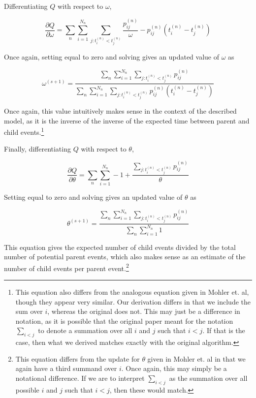 \documentclass[12pt]{amsart}
\begin{document}
Differentiating $Q$ with respect to $\omega$, 

\begin{equation*}
\frac{\partial Q}{\partial \omega}  =  \sum_n \sum_{i=1}^{N_n} \sum_{j : t_i^{(n)} < t_j^{(n)}} \frac{p_{ij}^{(n)}}{\omega} - p_{ij}^{(n)}(t_i^{(n)} - t_j^{(n)}) 
\end{equation*}

Once again, setting equal to zero and solving gives an updated value of $\omega$ as 

\begin{equation*}
\omega^{(s+1)} = \frac{\sum_n \sum_{i=1}^{N_n} \sum_{j : t_i^{(n)} < t_j^{(n)}} p_{ij}^{(n)}}{ \sum_n \sum_{i=1}^{N_n} \sum_{j : t_i^{(n)} < t_j^{(n)}}  p_{ij}^{(n)}(t_i^{(n)} - t_j^{(n)}) }
\end{equation*}

Once again, this value intuitively makes sense in the context of the described model, as it is the inverse of the inverse of the expected time between parent and child events.\footnote{This equation also differs from the analogous equation given in Mohler et. al, though they appear very similar. Our derivation differs in that we include the sum over $i$, whereas the original does not. This may just be a difference in notation, as it is possible that the original paper meant for the notation $\sum_{i<j}$ to denote a summation over all $i$ and $j$ such that $i < j$. If that is the case, then what we derived matches exactly with the original algorithm. }

Finally, differentiating $Q$ with respect to $\theta$,

\begin{equation*}
\frac{\partial Q}{ \partial \theta}  =  \sum_n \sum_{i=1}^{N_n} - 1 + \frac{\sum_{j : t_i^{(n)} < t_j^{(n)}} p_{ij}^{(n)}}{\theta}
\end{equation*}

Setting equal to zero and solving gives an updated value of $\theta$ as

\begin{equation*}
\theta^{(s+1)} = \frac{\sum_n \sum_{i=1}^{N_n} \sum_{j : t_i^{(n)} < t_j^{(n)}} p_{ij}^{(n)}}{\sum_n \sum_{i=1}^{N_n} 1}
\end{equation*}

This equation gives the expected number of child events divided by the total number of potential parent events, which also makes sense as an estimate of the number of child events per parent event.\footnote{This equation differs from the update for $\theta$ given in Mohler et. al in that we again have a third summand over $i$. Once again, this may simply be a notational difference. If we are to interpret $\sum_{i<j}$ as the summation over all possible $i$ and $j$ such that $i < j$, then these would match. }



\end{document}
